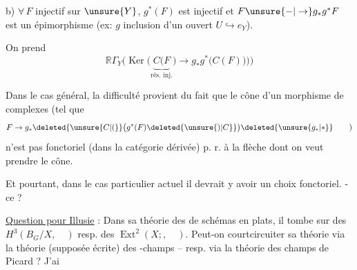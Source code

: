 
b) $\forall\,F$ injectif sur $\unsure{Y}$, $g^{*}(F)$ est injectif et $F\unsure{\mathord{-}|\to}g_{*}g^{*}F$ est un épimorphisme (ex: $g$ inclusion d'un ouvert $U\hookrightarrow e_{Y}$).

On prend
\[
\mathbb R\Gamma_{Y}\bigl(\operatorname{Ker}\bigl(\underbrace{C(F}_{\text{rés. inj.}})\to g_{*}g^{*}\bigl(C(F)\bigr)\bigr)\bigr)
\]

Dans le cas général, la difficulté provient du fait que le cône d'un morphisme de complexes (tel que
\[
F\to g_{*}\deleted{\unsure{C|(}}\bigl(g^{*}(F)\deleted{\unsure{)|C}}\bigr)\deleted{\unsure{g_{*}|*}}\qquad\text{)}
\]
n'est pas fonctoriel (dans la catégorie dérivée) p. r. à la flèche dont on veut prendre le cône.

Et pourtant, dans le cas particulier actuel il devrait y avoir un choix fonctoriel. -ce  ?

\uline{Question pour Illusie} : Dans sa théorie des  de schémas en  plats, il tombe sur des $H^{3}(B_{G}/X,\quad)$ resp. des $\operatorname{Ext}^{2}(X;,\quad)$. Peut-on courtcircuiter sa théorie via la théorie (supposée écrite) des -champs -- resp. via la théorie des champs de Picard ? J'ai
